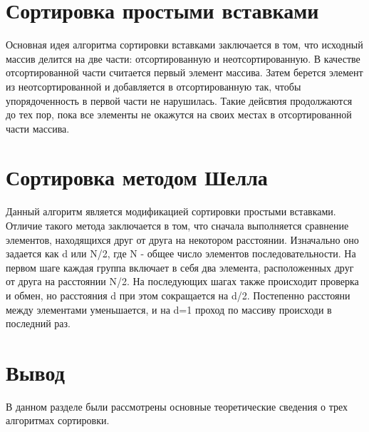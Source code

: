 \section{Сортировка простыми вставками}
Основная идея алгоритма сортировки вставками заключается в том, что исходный массив делится на две части: отсортированную и неотсортированную. В качестве отсортированной части считается первый элемент массива. Затем берется элемент из неотсортированной и добавляется в отсортированную так, чтобы упорядоченность в первой части не нарушилась. Такие дейсвтия продолжаются до тех пор, пока все элементы не окажутся на своих местах в отсортированной части массива.

\section{Сортировка методом Шелла}
Данный алгоритм является модификацией сортировки простыми вставками. Отличие такого метода заключается в том, что сначала выполняется сравнение элементов, находящихся друг от друга на некотором расстоянии. Изначально оно задается как d или N/2, где N - общее число элементов последовательности. На первом шаге каждая группа включает в себя два элемента, расположенных друг от друга на расстоянии N/2. На последующих шагах также происходит проверка и обмен, но расстояния d при этом сокращается на d/2. Постепенно расстояни между элементами уменьшается, и на d=1 проход по массиву происходи в последний раз. 

\section{Вывод}
В данном разделе были рассмотрены основные теоретические сведения о трех алгоритмах сортировки. 